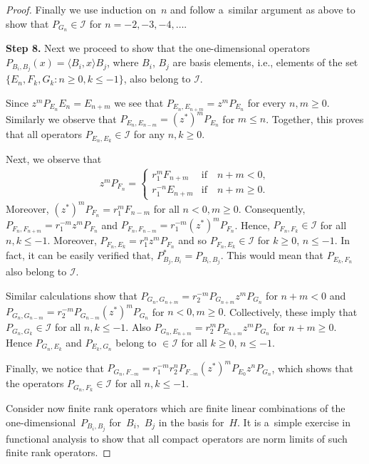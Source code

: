 \documentclass[pdftex]{sigma}
\numberwithin{equation}{section}
\begin{document}
\begin{proof}
Finally we use induction on~$n$ and follow a~similar argument as above to show that $P_{G_n} \in \mathcal I$ for
$n=-2,-3, -4, \dots$.

{\bf Step 8.} Next we proceed to show that the one-dimensional operators $P_{B_i, B_j}(x)= \langle B_i, x \rangle B_j$,
where $B_i$, $B_j$ are basis elements, i.e., elements of the set $\{E_n, F_k, G_k: n \geq 0, k \leq -1\}$, also belong to
$\mathcal I$.

Since $z^m P_{E_n}E_n= E_{n+m}$ we see that $P_{E_n, E_{n+m}}=z^m P_{E_n}$ for every $n,m \geq 0$.
Similarly we observe that $P_{E_n, E_{n-m}}=(z^*)^mP_{E_n}$ for $m \leq n$.
Together, this proves that all operators $P_{E_n, E_k} \in \mathcal I$ for any $n,k \geq 0$.

Next, we observe that
\begin{gather*}
z^m P_{F_n}=
\begin{cases}
r_1^m F_{n+m} & \text{if}\quad  n+m <0,
\\
r_1^{-n}E_{n+m} & \text{if}\quad  n+m \geq 0.
\end{cases}
\end{gather*}
Moreover, $(z^*)^m P_{F_n}=r_1^m F_{n-m}$ for all $n<0, m\geq 0$.
Consequently, $P_{F_n,F_{n+m}}=r_1^{-m}z^m P_{F_n}$ and $P_{F_n,F_{n-m}}=r_1^{-m} (z^*)^m P_{F_n}$.
Hence, $P_{F_n, F_k} \in \mathcal I$ for all $n,k \leq -1$.
Moreover, $P_{F_n,E_k}=r_1^nz^mP_{F_n}$ and so $P_{F_n,E_k}\in\mathcal I$ for $k\geq 0$, $n\leq -1$.
In fact, it can be easily verif\/ied that, $P_{B_j, B_i}^*=P_{B_i, B_j}$.
This would mean that $P_{E_k,F_n}$ also belong to $\mathcal I$.

Similar calculations show that $P_{G_n, G_{n+m}}= r_2^{-m}P_{G_{n+m}}z^m P_{G_n}$ for $n+m<0$ and $P_{G_n, G_{n-m}}=
r_2^{-m}P_{G_{n-m}}(z^*)^m P_{G_n}$ for $n<0, m\geq 0$.
Collectively, these imply that $P_{G_n, G_k} \in \mathcal I$ for all \mbox{$n,k \leq -1$}.
Also $P_{G_n, E_{n+m}}= r_2^{m}P_{E_{n+m}}z^m P_{G_n}$ for $n+m \geq 0$.
Hence $P_{G_n, E_k}$ and $P_{E_k,G_n}$ belong to $\in \mathcal I$ for all $k \geq 0$, $n \leq -1$.

Finally, we notice that $P_{G_n, F_{-m}}= r_1^{-m}r_2^n P_{F_{-m}}(z^*)^m P_{E_0}z^n P_{G_n}$, which shows that the
operators $P_{G_n, F_k} \in \mathcal I$ for all $n,k \leq -1$.

Consider now f\/inite rank operators which are f\/inite linear combinations of the one-dimensio\-nal~$P_{B_i, B_j}$ for~$B_i$,~$B_j$ in the basis for~$H$.
It is a~simple exercise in functional analysis to show that all compact operators are norm limits of such f\/inite rank
operators.
\end{proof}
\end{document}

